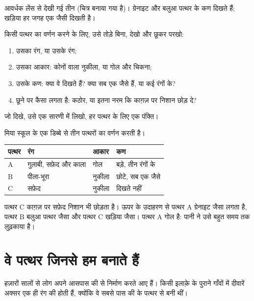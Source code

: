 \begin{omfigure}
{\small आवर्धक लेंस से देखी गई तीन  (चित्र बनाया गया है)। ग्रेनाइट और
बलुआ पत्थर के कण दिखते हैं; खड़िया हर जगह एक जैसी दिखती है।}
\label{fig:g3:stones-pebbles-sand:magnified}
\end{omfigure}

\begin{method}[पत्थर को पास से देखना]\label{met:g3:stones-pebbles-sand:look}
किसी पत्थर का वर्णन करने के लिए, उसे तोड़े बिना, देखो और छूकर परखो:
\begin{enumerate}
  \item उसका रंग, या उसके रंग;
  \item उसका आकार: कोनों वाला नुकीला, या गोल और चिकना;
  \item उसके कण: क्या वे दिखते हैं? क्या सब एक जैसे हैं, या कई रंगों के?
  \item छूने पर कैसा लगता है: कठोर, या इतना नरम कि काग़ज़ पर निशान छोड़ दे?
\end{enumerate}
जो दिखे, उसे एक सारणी में लिखो, हर पत्थर के लिए एक पंक्ति।
\end{method}

\begin{example}[तीन पत्थरों की सारणी]\label{ex:g3:stones-pebbles-sand:table}
मिया स्कूल के एक डिब्बे से तीन पत्थरों का वर्णन करती है।
\begin{center}\small
\begin{tabular}{llll}
\hline
पत्थर & रंग & आकार & कण \\
\hline
A & गुलाबी, सफ़ेद और काला & गोल & बड़े, तीन रंगों के \\
B & पीला-भूरा & नुकीला & छोटे, सब एक जैसे \\
C & सफ़ेद & नुकीला & दिखते नहीं \\
\hline
\end{tabular}
\end{center}
पत्थर C काग़ज़ पर सफ़ेद निशान भी छोड़ता है। ऊपर के उदाहरण से पत्थर A
ग्रेनाइट जैसा लगता है, पत्थर B बलुआ पत्थर जैसा और पत्थर C खड़िया जैसा।
पत्थर A गोल है: पानी ने उसे बहुत समय तक लुढ़काया है।
\end{example}

\section{वे पत्थर जिनसे हम बनाते हैं}

हज़ारों सालों से लोग अपने आसपास की  से निर्माण करते आए हैं। किसी
इलाक़े के पुराने गाँवों में दीवारें अक्सर एक ही रंग की होती हैं, क्योंकि वे
सबसे पास की  के पत्थर से बनी थीं।

